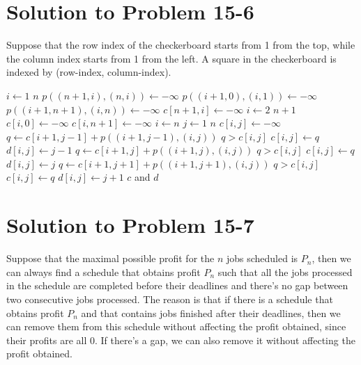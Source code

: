 \documentclass[a4paper, fleqn]{article}
\begin{document}
\section*{Solution to Problem 15-6}

Suppose that the row index of the checkerboard starts from 1 from the
top, while the column index starts from 1 from the left. A square in
the checkerboard is indexed by (row-index, column-index).

\begin{codebox}
\li \For $i \gets 1$ \To $n$
\li   \Do
        $p((n+1,i), (n,i)) \gets -\infty$
\li     $p((i+1,0), (i,1)) \gets -\infty$
\li     $p((i+1,n+1), (i,n)) \gets -\infty$
\li     $c[n+1,i] \gets -\infty$
      \End
\li \For $i \gets 2$ \To $n+1$
\li   \Do
        $c[i,0] \gets -\infty$
\li     $c[i,n+1] \gets -\infty$
      \End
\li \For $i \gets n$ 
\li   \Do
        \For $j \gets 1$ \To $n$
\li       \Do
            $c[i,j] \gets -\infty$
\li         $q \gets c[i+1,j-1] + p((i+1,j-1), (i,j))$
\li         \If $q > c[i,j]$
\li           \Then
                $c[i,j] \gets q$
\li             $d[i,j] \gets j-1$
              \End
\li         $q \gets c[i+1,j] + p((i+1,j), (i,j))$
\li         \If $q > c[i,j]$
\li           \Then
                $c[i,j] \gets q$
\li             $d[i,j] \gets j$
              \End
\li         $q \gets c[i+1,j+1] + p((i+1,j+1), (i,j))$
\li         \If $q > c[i,j]$
\li           \Then
                $c[i,j] \gets q$
\li             $d[i,j] \gets j+1$
              \End
          \End
      \End
\li \Return $c$ and $d$
\end{codebox}






\section*{Solution to Problem 15-7}

Suppose that the maximal possible profit for the $n$ jobs scheduled is
$P_n$, then we can always find a schedule that obtains profit $P_n$
such that all the jobs processed in the schedule are completed before
their deadlines and there's no gap between two consecutive jobs
processed.  The reason is that if there is a schedule that obtains
profit $P_n$ and that contains jobs finished after their deadlines,
then we can remove them from this schedule without affecting the
profit obtained, since their profits are all 0. If there's a gap, we
can also remove it without affecting the profit obtained.
\end{document}
